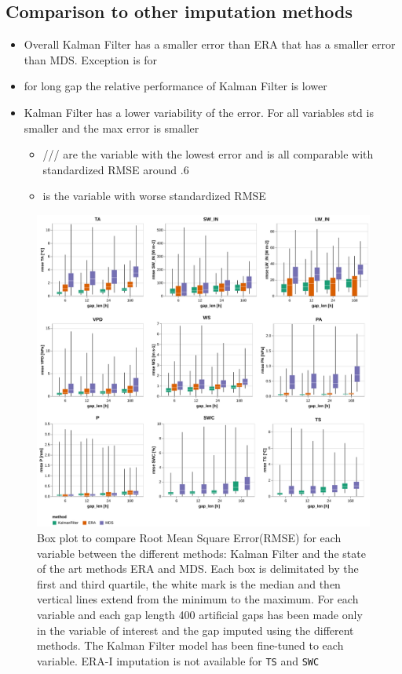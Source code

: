 \documentclass{article}
\newcommand{\imgwidth}{6in}
\let\Oldsubsection\subsection
\renewcommand{\subsection}{\FloatBarrier\Oldsubsection}
\begin{document}
\subsection{Comparison to other imputation methods}

\begin{itemize}
    \item Overall Kalman Filter has a smaller error than ERA that has a smaller error than MDS. Exception is for 
    \item for long gap the relative performance of Kalman Filter is lower
    \item Kalman Filter has a lower variability of the error. For all variables std is smaller and the max error is smaller
    \begin{itemize}
    \item {}/// are the variable with the lowest error and is all comparable with standardized RMSE around .6
    \item {} is the variable with worse standardized RMSE 
\end{itemize}
\end{itemize}

\begin{figure}
    \centerline{\includegraphics[width=\imgwidth]{the_plot}}
\caption{Box plot to compare Root Mean Square Error(RMSE) for each variable between the different methods: Kalman Filter and the state of the art methods ERA and MDS.  Each box is delimitated by the first and third quartile, the white mark is the median and then vertical lines extend from the minimum to the maximum. For each variable and each gap length 400 artificial gaps has been made only in the variable of interest and the gap imputed using the different methods. The Kalman Filter model has been fine-tuned to each variable. ERA-I imputation is not available for \texttt{TS} and \texttt{SWC}}
\label{fig:the_plot}
\end{figure}
\end{document}

